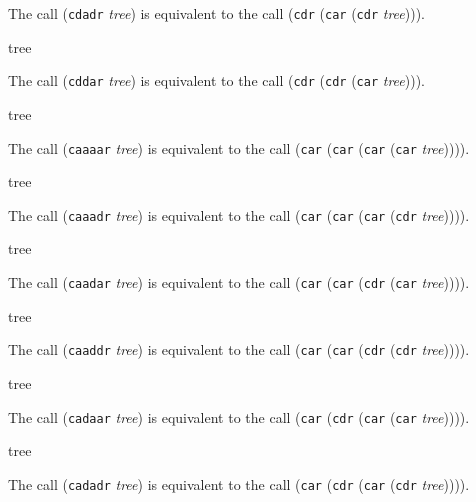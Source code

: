 The call (\texttt{cdadr} \textit{tree}) is equivalent to the call
(\texttt{cdr} (\texttt{car} (\texttt{cdr} \textit{tree}))).


 {tree}

The call (\texttt{cddar} \textit{tree}) is equivalent to the call
(\texttt{cdr} (\texttt{cdr} (\texttt{car} \textit{tree}))).

 {tree}

The call (\texttt{caaaar} \textit{tree}) is equivalent to the call
(\texttt{car} (\texttt{car} (\texttt{car} (\texttt{car}
\textit{tree})))).

 {tree}

The call (\texttt{caaadr} \textit{tree}) is equivalent to the call
(\texttt{car} (\texttt{car} (\texttt{car} (\texttt{cdr}
\textit{tree})))).

 {tree}

The call (\texttt{caadar} \textit{tree}) is equivalent to the call
(\texttt{car} (\texttt{car} (\texttt{cdr} (\texttt{car}
\textit{tree})))).

 {tree}

The call (\texttt{caaddr} \textit{tree}) is equivalent to the call
(\texttt{car} (\texttt{car} (\texttt{cdr} (\texttt{cdr}
\textit{tree})))).

 {tree}

The call (\texttt{cadaar} \textit{tree}) is equivalent to the call
(\texttt{car} (\texttt{cdr} (\texttt{car} (\texttt{car}
\textit{tree})))).

 {tree}

The call (\texttt{cadadr} \textit{tree}) is equivalent to the call
(\texttt{car} (\texttt{cdr} (\texttt{car} (\texttt{cdr}
\textit{tree})))).
